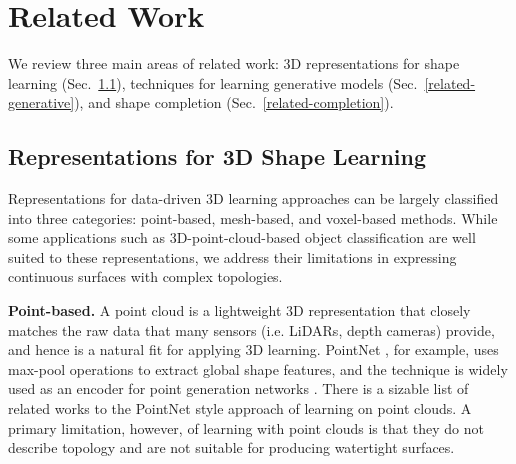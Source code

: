 \documentclass[10pt,twocolumn,letterpaper]{article}
\newcommand\jj[1]{\textcolor{blue}{\textbf{#1}}}
\begin{document}

\section{Related Work}

We review three main areas of related work: 3D representations for shape learning (Sec.~\ref{related-representations}), techniques for learning generative models (Sec.~\ref{related-generative}), and shape completion (Sec.~\ref{related-completion}).

\subsection{Representations for 3D Shape Learning}\label{related-representations}
Representations for data-driven 3D learning approaches can be largely classified into three categories: point-based, mesh-based, and voxel-based methods. %
While some applications such as 3D-point-cloud-based object classification are well suited to these representations, we address their limitations in expressing continuous surfaces with complex topologies.

\noindent\textbf{Point-based.} A point cloud %
is a lightweight 3D representation that closely matches the raw data that many sensors (i.e. LiDARs, depth cameras) provide, and hence is a natural fit for applying 3D learning. PointNet \cite{qi2017pointnet,qi2017pointnet++}, for example, uses max-pool operations to extract global shape features, and the technique is widely used as an encoder for point generation networks \cite{yang2017foldingnet,achlioptas2018learning}. There is a sizable list of related works to the PointNet style approach of learning on point clouds. 
A primary limitation, however, of learning with point clouds is that they do not describe topology and are not suitable for producing watertight surfaces. 
\end{document}
